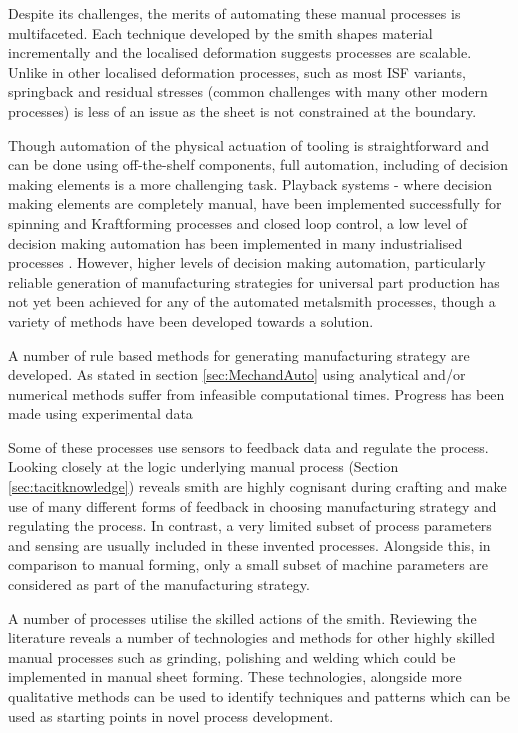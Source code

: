 Despite its challenges, the merits of automating these manual processes is multifaceted. Each technique developed by the smith shapes material incrementally and the localised deformation suggests processes are scalable. Unlike in other localised deformation processes, such as most ISF variants, springback and residual stresses (common challenges with many other modern processes) is less of an issue as the sheet is not constrained at the boundary. 

Though automation of the physical actuation of tooling is straightforward and can be done using off-the-shelf components, full automation, including of decision making elements is a more challenging task. Playback systems - where decision making elements are completely manual, have been implemented successfully for spinning \citep{Lloyd1986AnProspective} and Kraftforming \citep{Hoffman2009AnHandling} processes and closed loop control, a low level of decision making automation has been implemented in many industrialised processes \citep{Allwood2016Closed-loopForming}. However, higher levels of decision making automation, particularly reliable generation of manufacturing strategies for universal part production has not yet been achieved for any of the automated metalsmith processes, though a variety of methods have been developed towards a solution.

A number of rule based methods for generating manufacturing strategy are developed. As stated in section \ref{sec:MechandAuto} using analytical and/or numerical methods suffer from infeasible  computational times. Progress has been made using experimental data

Some of these processes use sensors to feedback data and regulate the process. Looking closely at the logic underlying manual process (Section \ref{sec:tacitknowledge}) reveals smith are highly cognisant during crafting and make use of many different forms of feedback in choosing manufacturing strategy and regulating the process. In contrast, a very limited subset of process parameters and sensing are usually included in these invented processes. Alongside this, in comparison to manual forming, only a small subset of machine parameters are considered as part of the manufacturing strategy.

A number of processes utilise the skilled actions of the smith. Reviewing the literature reveals a number of technologies and methods for other highly skilled manual processes such as grinding, polishing and welding which could be implemented in manual sheet forming. These technologies, alongside more qualitative methods can be used to identify techniques and patterns which can be used as starting points in novel process development.





